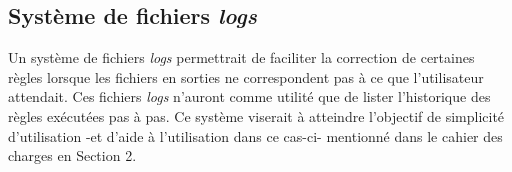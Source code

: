 	\subsection{Système de fichiers \textit{logs}}
	
		Un système de fichiers \textit{logs} permettrait de faciliter la correction de certaines règles lorsque les fichiers en sorties ne correspondent pas à ce que l'utilisateur attendait. Ces fichiers \textit{logs} n'auront comme utilité que de lister l'historique des règles exécutées pas à pas. Ce système viserait à atteindre l'objectif de simplicité d'utilisation -et d'aide à l'utilisation dans ce cas-ci- mentionné dans le cahier des charges en Section 2.